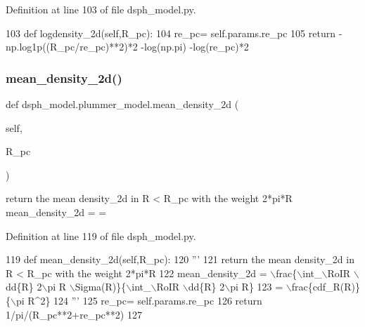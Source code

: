 Definition at line 103 of file dsph\+\_\+model.\+py.


\begin{DoxyCode}
103     \textcolor{keyword}{def }logdensity\_2d(self,R\_pc):
104         re\_pc= self.params.re\_pc
105         \textcolor{keywordflow}{return} -np.log1p((R\_pc/re\_pc)**2)*2 -log(np.pi) -log(re\_pc)*2
\end{DoxyCode}
\mbox{\label{classdsph__model_1_1plummer__model_a24b8450cd00f5306673580e428a85886}} 
\subsubsection{\texorpdfstring{mean\+\_\+density\+\_\+2d()}{mean\_density\_2d()}}
{\footnotesize\ttfamily def dsph\+\_\+model.\+plummer\+\_\+model.\+mean\+\_\+density\+\_\+2d (\begin{DoxyParamCaption}\item[{}]{self,  }\item[{}]{R\+\_\+pc }\end{DoxyParamCaption})}

\begin{DoxyVerb}return the mean density_2d in R < R_pc with the weight 2*pi*R
mean_density_2d = 
    = 
\end{DoxyVerb}
 

Definition at line 119 of file dsph\+\_\+model.\+py.


\begin{DoxyCode}
119     \textcolor{keyword}{def }mean\_density\_2d(self,R\_pc):
120         \textcolor{stringliteral}{'''}
121 \textcolor{stringliteral}{        return the mean density\_2d in R < R\_pc with the weight 2*pi*R}
122 \textcolor{stringliteral}{        mean\_density\_2d = \(\backslash\)frac\{\(\backslash\)int\_\(\backslash\)RoIR \(\backslash\)dd\{R\} 2\(\backslash\)pi R \(\backslash\)Sigma(R)\}\{\(\backslash\)int\_\(\backslash\)RoIR \(\backslash\)dd\{R\} 2\(\backslash\)pi R\}}
123 \textcolor{stringliteral}{            = \(\backslash\)frac\{cdf\_R(R)\}\{\(\backslash\)pi R^2\}}
124 \textcolor{stringliteral}{        '''}
125         re\_pc= self.params.re\_pc
126         \textcolor{keywordflow}{return} 1/pi/(R\_pc**2+re\_pc**2)
127     
\end{DoxyCode}


